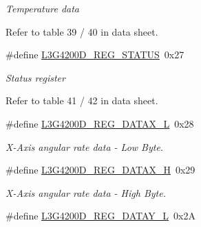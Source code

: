 \begin{DoxyCompactItemize}
\begin{DoxyCompactList}\small\item\em \-Temperature data\par
 \-Refer to table 39 / 40 in data sheet. \end{DoxyCompactList}\item 
\hypertarget{group___l3_g4200_d___r_e_g_i_s_t_e_r_s_ga6d11a79225bed920d5ac4cdcf8d93160}{\#define \hyperlink{group___l3_g4200_d___r_e_g_i_s_t_e_r_s_ga6d11a79225bed920d5ac4cdcf8d93160}{\-L3\-G4200\-D\-\_\-\-R\-E\-G\-\_\-\-S\-T\-A\-T\-U\-S}~0x27}\label{group___l3_g4200_d___r_e_g_i_s_t_e_r_s_ga6d11a79225bed920d5ac4cdcf8d93160}

\begin{DoxyCompactList}\small\item\em \-Status register\par
 \-Refer to table 41 / 42 in data sheet. \end{DoxyCompactList}\item 
\hypertarget{group___l3_g4200_d___r_e_g_i_s_t_e_r_s_gafbad426ec9eafa3e09f42dd2ed2a0736}{\#define \hyperlink{group___l3_g4200_d___r_e_g_i_s_t_e_r_s_gafbad426ec9eafa3e09f42dd2ed2a0736}{\-L3\-G4200\-D\-\_\-\-R\-E\-G\-\_\-\-D\-A\-T\-A\-X\-\_\-\-L}~0x28}\label{group___l3_g4200_d___r_e_g_i_s_t_e_r_s_gafbad426ec9eafa3e09f42dd2ed2a0736}

\begin{DoxyCompactList}\small\item\em \-X-\/\-Axis angular rate data -\/ \-Low \-Byte. \end{DoxyCompactList}\item 
\hypertarget{group___l3_g4200_d___r_e_g_i_s_t_e_r_s_ga0a6a177960618db5ab14adffadb3f974}{\#define \hyperlink{group___l3_g4200_d___r_e_g_i_s_t_e_r_s_ga0a6a177960618db5ab14adffadb3f974}{\-L3\-G4200\-D\-\_\-\-R\-E\-G\-\_\-\-D\-A\-T\-A\-X\-\_\-\-H}~0x29}\label{group___l3_g4200_d___r_e_g_i_s_t_e_r_s_ga0a6a177960618db5ab14adffadb3f974}

\begin{DoxyCompactList}\small\item\em \-X-\/\-Axis angular rate data -\/ \-High \-Byte. \end{DoxyCompactList}\item 
\hypertarget{group___l3_g4200_d___r_e_g_i_s_t_e_r_s_ga7a1702cabf5046f28ce3824e4ae9f8a9}{\#define \hyperlink{group___l3_g4200_d___r_e_g_i_s_t_e_r_s_ga7a1702cabf5046f28ce3824e4ae9f8a9}{\-L3\-G4200\-D\-\_\-\-R\-E\-G\-\_\-\-D\-A\-T\-A\-Y\-\_\-\-L}~0x2\-A}\label{group___l3_g4200_d___r_e_g_i_s_t_e_r_s_ga7a1702cabf5046f28ce3824e4ae9f8a9}


\end{DoxyCompactItemize}
